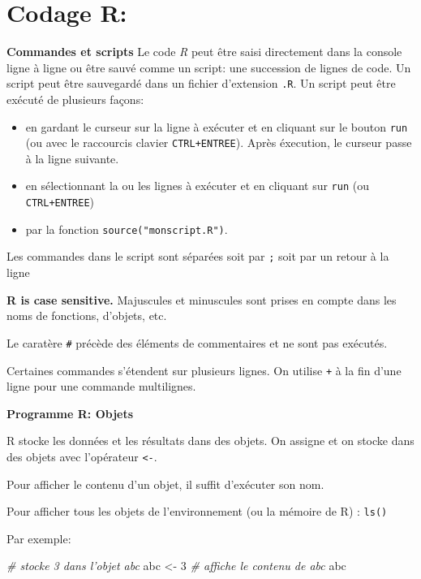 \documentclass[]{book}
\newenvironment{Shaded}{\begin{snugshade}}{\end{snugshade}}
\newcommand{\CommentTok}[1]{\textcolor[rgb]{0.56,0.35,0.01}{\textit{#1}}}
\newcommand{\DecValTok}[1]{\textcolor[rgb]{0.00,0.00,0.81}{#1}}
\newcommand{\NormalTok}[1]{#1}
\newcommand{\StringTok}[1]{\textcolor[rgb]{0.31,0.60,0.02}{#1}}
\providecommand{\tightlist}{%
  \setlength{\itemsep}{0pt}\setlength{\parskip}{0pt}}
\begin{document}
\hypertarget{codage-r-1}{%
\section{Codage R:}\label{codage-r-1}}

\textbf{Commandes et scripts}
Le code \emph{R} peut être saisi directement dans la console ligne à ligne ou être sauvé comme un script: une succession de lignes de code. Un script peut être sauvegardé dans un fichier d'extension \texttt{.R}. Un script peut être exécuté de plusieurs façons:

\begin{itemize}
\tightlist
\item
  en gardant le curseur sur la ligne à exécuter et en cliquant sur le bouton \texttt{run} (ou avec le raccourcis clavier \texttt{CTRL+ENTREE}). Après éxecution, le curseur passe à la ligne suivante.\\
\item
  en sélectionnant la ou les lignes à exécuter et en cliquant sur \texttt{run} (ou \texttt{CTRL+ENTREE})\\
\item
  par la fonction \texttt{source("monscript.R")}.
\end{itemize}

Les commandes dans le script sont séparées soit par \texttt{;} soit par un retour à la ligne

\textbf{R is case sensitive.} Majuscules et minuscules sont prises en compte dans les noms de fonctions, d'objets, etc.

Le caratère \texttt{\#} précède des éléments de commentaires et ne sont pas exécutés.

Certaines commandes s'étendent sur plusieurs lignes. On utilise \texttt{+} à la fin d'une ligne pour une commande multilignes.

\textbf{Programme R: Objets}

R stocke les données et les résultats dans des objets. On assigne et on stocke dans des objets avec l'opérateur \texttt{\textless{}-}.

Pour afficher le contenu d'un objet, il suffit d'exécuter son nom.

Pour afficher tous les objets de l'environnement (ou la mémoire de R) : \texttt{ls()}

Par exemple:

\begin{Shaded}
\begin{Highlighting}[]
\CommentTok{# stocke 3 dans l'objet abc}
\NormalTok{abc <-}\StringTok{ }\DecValTok{3}
\CommentTok{# affiche le contenu de abc}
\NormalTok{abc}
\end{Highlighting}
\end{Shaded}
\end{document}

